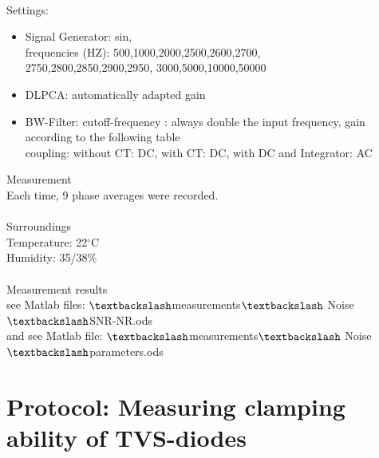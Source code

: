 \\
{\Large Settings:} \newline
\begin{itemize}
\item Signal Generator:  sin,\\
frequencies (HZ): 500,1000,2000,2500,2600,2700,\\
2750,2800,2850,2900,2950, 3000,5000,10000,50000
\item DLPCA:  automatically adapted gain
\item BW-Filter:  cutoff-frequency : always double the input frequency, gain according to the following table\\ coupling: without CT: DC, with CT: DC, with DC and Integrator: AC
\end{itemize}
{\Large Measurement} \\
Each time, 9 phase averages were recorded. \\
\\
{\Large Surroundings} \\
Temperature:  22$^{\circ}$C\\
Humidity: 35/38$\%$\\
\\
{\Large Measurement results}\\
see Matlab files: $\textbackslash$measurements$\textbackslash$ Noise$\textbackslash$SNR-NR.ods\\
and see Matlab file: $\textbackslash$measurements$\textbackslash$ Noise$\textbackslash$parameters.ods


\section{Protocol: Measuring clamping ability of TVS-diodes}

